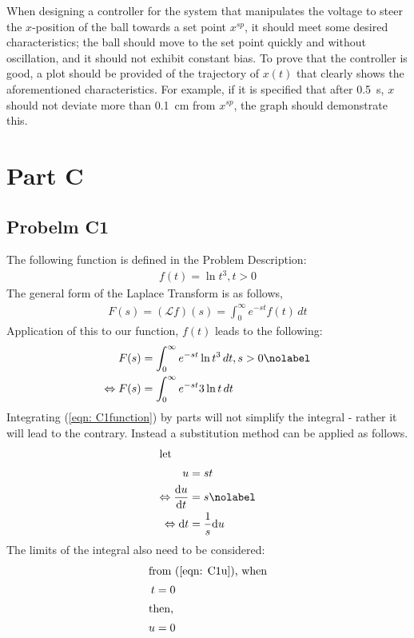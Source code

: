 \documentclass[a4paper,10pt,reqno]{amsart}
\numberwithin{equation}{section}
\begin{document}
When designing a controller for the system that manipulates the voltage to steer the $x$-position of the ball towards a set point $x^{sp}$, it should meet some desired characteristics; the ball should move to the set point quickly and without oscillation, and it should not exhibit constant bias. To prove that the controller is good, a plot should be provided of the trajectory of $x(t)$ that clearly shows the aforementioned characteristics. For example, if it is specified that after 0.5~s, $x$ should not deviate more than 0.1~cm from $x^{sp}$, the graph should demonstrate this.

\section{Part C}

\subsection{Probelm C1}\label{sec:c1}
The following function is defined in the Problem Description:
\begin{align}
f(t) = \ln t^3, t>0 \label{eqn: C1function}
\end{align}
The general form of the Laplace Transform is as follows,
\begin{align}
F(s) = (\mathscr{L}f)(s) =  \int_{0}^{\infty} e^{-st}f(t) \,dt  \label{eqn: Laplace}
\end{align}
Application of this to our function, $f(t)$ leads to the following:
\begin{align}
F(s) &= \int_{0}^{\infty} e^{-st} \ln t^3 \,dt, s>0  \nolabel \\
\Leftrightarrow F(s) &= \int_{0}^{\infty} e^{-st} 3\ln t \,dt  \label{eqn: C1beginning}
\end{align}
Integrating (\ref{eqn: C1function}) by parts will not simplify the integral - rather it will lead to the contrary. Instead a substitution method can be applied as follows.
\begin{align}
\intertext{let}
u &=st \label{eqn: C1u} \\
\Leftrightarrow \frac{\mathrm{d}u}{\mathrm{d}t} &= s \nolabel \\
\Leftrightarrow \mathrm{d}t &= \frac{1}{s} \mathrm{d}u \label{eqn: c1dt}
\end{align}
The limits of the integral also need to be considered:
\begin{align*}
\intertext{from (\ref{eqn: C1u}), when}
t &= 0 \\
\intertext{then,}
u &= 0 
\end{align*}
\end{document}
